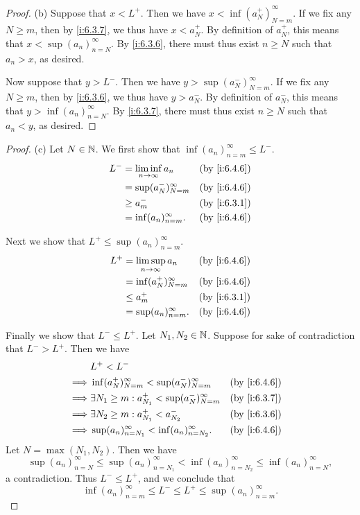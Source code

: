\begin{proof}{(b)}
  Suppose that \(x < L^+\).
  Then we have \(x < \inf(a_N^+)_{N = m}^\infty\).
  If we fix any \(N \geq m\), then by \cref{i:6.3.7}, we thus have \(x < a_N^+\).
  By definition of \(a_N^+\), this means that \(x < \sup(a_n)_{n = N}^\infty\).
  By \cref{i:6.3.6}, there must thus exist \(n \geq N\) such that \(a_n > x\), as desired.

  Now suppose that \(y > L^-\).
  Then we have \(y > \sup(a_N^-)_{N = m}^\infty\).
  If we fix any \(N \geq m\), then by \cref{i:6.3.6}, we thus have \(y > a_N^-\).
  By definition of \(a_N^-\), this means that \(y > \inf(a_n)_{n = N}^\infty\).
  By \cref{i:6.3.7}, there must thus exist \(n \geq N\) such that \(a_n < y\), as desired.
\end{proof}

\begin{proof}{(c)}
  Let \(N \in \mathbb{N}\).
  We first show that \(\inf(a_n)_{n = m}^\infty \leq L^-\).
  \begin{align*}
    L^- & = \liminf_{n \to \infty} a_n &  & \by{i:6.4.6} \\
        & = \sup(a_N^-)_{N = m}^\infty &  & \by{i:6.4.6} \\
        & \geq a_m^-                   &  & \by{i:6.3.1} \\
        & = \inf(a_n)_{n = m}^\infty.  &  & \by{i:6.4.6}
  \end{align*}

  Next we show that \(L^+ \leq \sup(a_n)_{n = m}^\infty\).
  \begin{align*}
    L^+ & = \limsup_{n \to \infty} a_n &  & \by{i:6.4.6} \\
        & = \inf(a_N^+)_{N = m}^\infty &  & \by{i:6.4.6} \\
        & \leq a_m^+                   &  & \by{i:6.3.1} \\
        & = \sup(a_n)_{n = m}^\infty.  &  & \by{i:6.4.6}
  \end{align*}

  Finally we show that \(L^- \leq L^+\).
  Let \(N_1, N_2 \in \mathbb{N}\).
  Suppose for sake of contradiction that \(L^- > L^+\).
  Then we have
  \begin{align*}
             & L^+ < L^-                                                                     \\
    \implies & \inf(a_N^+)_{N = m}^\infty < \sup(a_N^-)_{N = m}^\infty     &  & \by{i:6.4.6} \\
    \implies & \exists N_1 \geq m : a_{N_1}^+ < \sup(a_N^-)_{N = m}^\infty &  & \by{i:6.3.7} \\
    \implies & \exists N_2 \geq m : a_{N_1}^+ < a_{N_2}^-                  &  & \by{i:6.3.6} \\
    \implies & \sup(a_n)_{n = N_1}^\infty < \inf(a_n)_{n = N_2}^\infty.    &  & \by{i:6.4.6}
  \end{align*}
  Let \(N = \max(N_1, N_2)\).
  Then we have
  \[
    \sup(a_n)_{n = N}^\infty \leq \sup(a_n)_{n = N_1}^\infty < \inf(a_n)_{n = N_2}^\infty \leq \inf(a_n)_{n = N}^\infty,
  \]
  a contradiction.
  Thus \(L^- \leq L^+\), and we conclude that
  \[
    \inf(a_n)_{n = m}^\infty \leq L^- \leq L^+ \leq \sup(a_n)_{n = m}^\infty.
  \]
\end{proof}


